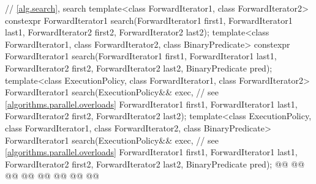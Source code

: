 \begin{codeblock}
{  // \ref{alg.search}, search
  template<class ForwardIterator1, class ForwardIterator2>
    constexpr ForwardIterator1
      search(ForwardIterator1 first1, ForwardIterator1 last1,
             ForwardIterator2 first2, ForwardIterator2 last2);
  template<class ForwardIterator1, class ForwardIterator2, class BinaryPredicate>
    constexpr ForwardIterator1
      search(ForwardIterator1 first1, ForwardIterator1 last1,
             ForwardIterator2 first2, ForwardIterator2 last2,
             BinaryPredicate pred);
  template<class ExecutionPolicy, class ForwardIterator1, class ForwardIterator2>
    ForwardIterator1
      search(ExecutionPolicy&& exec, // see \ref{algorithms.parallel.overloads}
             ForwardIterator1 first1, ForwardIterator1 last1,
             ForwardIterator2 first2, ForwardIterator2 last2);
  template<class ExecutionPolicy, class ForwardIterator1, class ForwardIterator2,
           class BinaryPredicate>
    ForwardIterator1
      search(ExecutionPolicy&& exec, // see \ref{algorithms.parallel.overloads}
             ForwardIterator1 first1, ForwardIterator1 last1,
             ForwardIterator2 first2, ForwardIterator2 last2,
             BinaryPredicate pred);
  @@
    @@
        @@
        @@
      @@
      @@
                @@
                @@

}
\end{codeblock}
